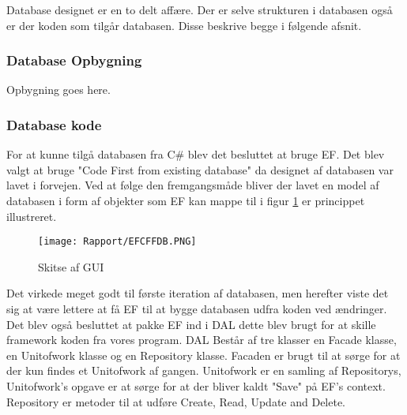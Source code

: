 Database designet er en to delt affære. Der er selve strukturen i databasen også er der koden som tilgår databasen.
Disse beskrive begge i følgende afsnit.

\subsubsection{Database Opbygning}
Opbygning goes here.

\subsubsection{Database kode}
For at kunne tilgå databasen fra C\# blev det besluttet at bruge \gls{EF}. 
Det blev valgt at bruge "Code First from existing database" da designet af databasen var lavet i forvejen.
Ved at følge den fremgangsmåde bliver der lavet en model af databasen i form af objekter som \gls{EF} 
kan mappe til i figur \ref{fig:CodeFirstFromDB} er princippet illustreret.

\begin{figure}[H]
    \centering
	\texttt{[image: Rapport/EFCFFDB.PNG]}
	\caption{Skitse af GUI}
	\label{fig:CodeFirstFromDB}
\end{figure} 

Det virkede meget godt til første iteration af databasen, men herefter viste det sig at være lettere at få \gls{EF} til at bygge
databasen udfra koden ved ændringer.
\newline
Det blev også besluttet at pakke \gls{EF} ind i \gls{DAL} dette blev brugt for at skille framework koden fra vores program.
\gls{DAL} Består af tre klasser en Facade klasse, en Unitofwork klasse og en Repository klasse. 
Facaden er brugt til at sørge for at der kun findes et Unitofwork af gangen. 
Unitofwork er en samling af Repositorys, Unitofwork's opgave er at sørge for at der bliver kaldt "Save" på \gls{EF}'s context.
Repository er metoder til at udføre Create, Read, Update and Delete.
